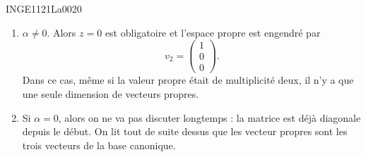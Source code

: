 \begin{corrige}{INGE1121La0020}
\begin{enumerate}
		\item
			$\alpha\neq 0$. Alors $z=0$ est obligatoire et l'espace propre est engendré par
			\begin{equation}
				v_{2}=\begin{pmatrix}
					1	\\ 
					0	\\ 
					0	
				\end{pmatrix}.
			\end{equation}
			Dans ce cas, même si la valeur propre était de multiplicité deux, il n'y a que une seule dimension de vecteurs propres.
		\item
			Si $\alpha=0$, alors on ne va pas discuter longtemps : la matrice est déjà diagonale depuis le début. On lit tout de suite dessus que les vecteur propres sont les trois vecteurs de la base canonique.

	\end{enumerate}
	
\end{corrige}
